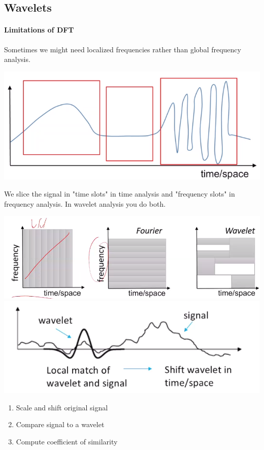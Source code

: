 \documentclass[10pt]{report}
\begin{document}
\subsection{Wavelets}
\paragraph{Limitations of DFT} Sometimes we might need localized frequencies rather than global frequency analysis.
\begin{center}
	\includegraphics[scale=0.5]{10.png}
\end{center}
We slice the signal in "time slots" in time analysis and "frequency slots" in frequency analysis. In wavelet analysis you do both.\begin{center}
	\includegraphics[scale=0.33]{11.png}\\
	\includegraphics[scale=0.5]{12.png}
\end{center}
\begin{enumerate}
	\item Scale and shift original signal
	\item Compare signal to a wavelet
	\item Compute coefficient of similarity
\end{enumerate}
\end{document}
